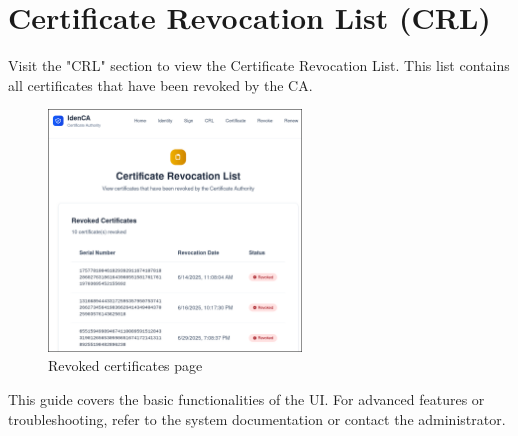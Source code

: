 \section{Certificate Revocation List (CRL)}
Visit the "CRL" section to view the Certificate Revocation List. 
This list contains all certificates that have been revoked by the CA. 
\begin{figure}[h!]
    \centering
    \includegraphics[keepaspectratio, width=0.6\textwidth]{Pic/11_crl.png}
    \caption{Revoked certificates page}
    \label{fig:crl-page}
\end{figure}


This guide covers the basic functionalities of the UI. For advanced features or troubleshooting, 
refer to the system documentation or contact the administrator.